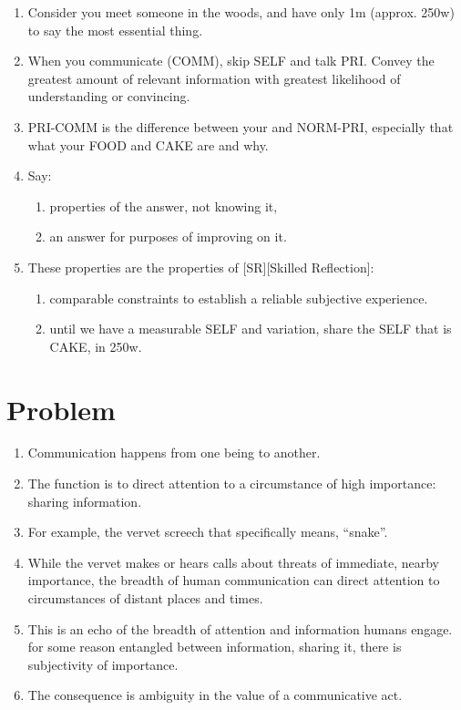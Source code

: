 \documentclass[
]{book}
\providecommand{\tightlist}{%
  \setlength{\itemsep}{0pt}\setlength{\parskip}{0pt}}
\begin{document}
\begin{enumerate}
\def\labelenumi{\arabic{enumi}.}
\item
  Consider you meet someone in the woods, and have only 1m (approx.
  250w) to say the most essential thing.
\item
  When you communicate (COMM), skip SELF and talk PRI. Convey the
  greatest amount of relevant information with greatest likelihood of
  understanding or convincing.
\item
  PRI-COMM is the difference between your and NORM-PRI, especially
  that what your FOOD and CAKE are and why.
\item
  Say:

  \begin{enumerate}
  \def\labelenumii{\arabic{enumii}.}
  \tightlist
  \item
    properties of the answer, not knowing it,
  \item
    an answer for purposes of improving on it.
  \end{enumerate}
\item
  These properties are the properties of {[}SR{]}{[}Skilled Reflection{]}:

  \begin{enumerate}
  \def\labelenumii{\arabic{enumii}.}
  \tightlist
  \item
    comparable constraints to establish a reliable subjective
    experience.
  \item
    until we have a measurable SELF and variation, share the SELF
    that is CAKE, in 250w.
  \end{enumerate}
\end{enumerate}

\hypertarget{problem-1}{%
\section{Problem}\label{problem-1}}

\begin{enumerate}
\def\labelenumi{\arabic{enumi}.}
\setcounter{enumi}{5}
\item
  Communication happens from one being to another.
\item
  The function is to direct attention to a circumstance of high
  importance: sharing information.
\item
  For example, the vervet screech that specifically means, ``snake''.
\item
  While the vervet makes or hears calls about threats of immediate,
  nearby importance, the breadth of human communication can direct
  attention to circumstances of distant places and times.
\item
  This is an echo of the breadth of attention and information humans
  engage. for some reason entangled between information, sharing it,
  there is subjectivity of importance.
\item
  The consequence is ambiguity in the value of a communicative act.
\end{enumerate}
\end{document}
